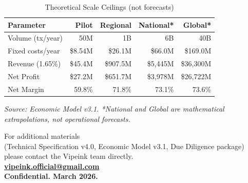 \documentclass[11pt,a4paper]{article}
\newcommand{\tablesource}[1]{%
\par\vspace{3pt}%
{\footnotesize\color{gray!80}\textit{Source: #1}}%
\par\vspace{2pt}%
}
\begin{document}
\begin{table}[htbp]
\centering
\caption{Theoretical Scale Ceilings (not forecasts)}
\small
\begin{tabularx}{\linewidth}{@{}lRRRR@{}}
\toprule
\textbf{Parameter} & \textbf{Pilot} & \textbf{Regional} & \textbf{National*} & \textbf{Global*} \\
\midrule
Volume (tx/year)       & 50M      & 1B        & 6B         & 40B        \\
Fixed costs/year       & \$8.54M  & \$26.1M   & \$66.0M    & \$169.0M   \\
Revenue (1.65\%)       & \$45.4M  & \$907.5M  & \$5,445M   & \$36,300M  \\
Net Profit             & \$27.2M  & \$651.7M  & \$3,978M   & \$26,722M  \\
Net Margin             & 59.8\%   & 71.8\%    & 73.1\%     & 73.6\%     \\
\bottomrule
\end{tabularx}
\tablesource{Economic Model v3.1. *National and Global are mathematical extrapolations, not operational forecasts.}
\end{table}


\vspace{1em}
\begin{center}
{\small\color{gray!80}
For additional materials\\
(Technical Specification v4.0, Economic Model v3.1, Due Diligence package)\\[6pt]
please contact the Vipeink team directly.\\[10pt]
\href{mailto:vipeink.official@gmail.com}{\textbf{vipeink.official@gmail.com}}\\[8pt]
\textbf{Confidential. March 2026.}
}
\end{center}
\end{document}
